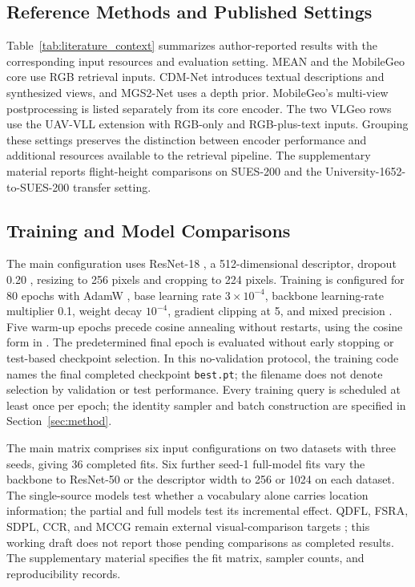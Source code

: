 \documentclass[journal]{IEEEtran}
\begin{document}
\subsection{Reference Methods and Published Settings}

Table~\ref{tab:literature_context} summarizes author-reported results with
the corresponding input resources and evaluation setting. MEAN and the
MobileGeo core use RGB retrieval inputs. CDM-Net introduces textual
descriptions and synthesized views, and MGS2-Net uses a depth prior.
MobileGeo's multi-view postprocessing is listed separately from its core
encoder. The two VLGeo rows use the UAV-VLL extension with RGB-only and
RGB-plus-text inputs. Grouping these settings preserves the distinction
between encoder performance and additional resources available to the
retrieval pipeline. The supplementary material reports flight-height
comparisons on SUES-200 and the University-1652-to-SUES-200 transfer setting.



\subsection{Training and Model Comparisons}

The main configuration uses ResNet-18 \cite{resnet2016}, a 512-dimensional
descriptor, dropout 0.20 \cite{dropout2014}, resizing to 256 pixels and
cropping to 224 pixels. Training is configured for 80 epochs with AdamW
\cite{adamw2019}, base learning rate $3\times10^{-4}$, backbone learning-rate
multiplier 0.1, weight decay $10^{-4}$, gradient clipping at 5, and mixed
precision \cite{mixedprecision2018}. Five warm-up epochs precede cosine
annealing without restarts, using the cosine form in \cite{sgdr2017}.
The predetermined final epoch is evaluated without early stopping or
test-based checkpoint selection. In this no-validation protocol, the
training code names the final completed checkpoint \texttt{best.pt}; the
filename does not denote selection by validation or test performance. Every training query is scheduled at least
once per epoch; the identity sampler and batch construction are specified in
Section~\ref{sec:method}.

The main matrix comprises six input configurations on two datasets with
three seeds, giving 36 completed fits. Six further seed-1 full-model fits vary the backbone
to ResNet-50 or the descriptor width to 256 or 1024 on each dataset. The
single-source models test whether a vocabulary alone carries location
information; the partial and full models test its incremental effect.
QDFL, FSRA, SDPL, CCR, and MCCG remain external visual-comparison targets
\cite{qdfl2025,fsra2022,sdpl2024,ccr2024,mccg2024}; this working draft does
not report those pending comparisons as completed results. The supplementary
material specifies the fit matrix, sampler counts, and reproducibility
records.
\end{document}
